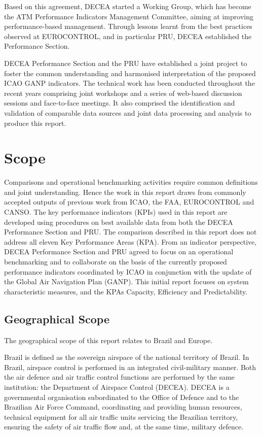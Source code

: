 \documentclass[
]{book}
\begin{document}
Based on this agreement, DECEA started a Working Group, which has become the ATM Performance Indicators Management Committee, aiming at improving performance-based management.
Through lessons learnt from the best practices observed at EUROCONTROL, and in particular PRU, DECEA established the Performance Section.

DECEA Performance Section and the PRU have established a joint project to foster the common understanding and harmonised interpretation of the proposed ICAO GANP indicators. The technical work has been conducted throughout the recent years comprising joint workshops and a series of web-based discussion sessions and face-to-face meetings.
It also comprised the identification and validation of comparable data sources and joint data processing and analysis to produce this report.

\hypertarget{scope}{%
\section{Scope}\label{scope}}

Comparisons and operational benchmarking activities require common definitions and joint understanding.
Hence the work in this report draws from commonly accepted outputs of previous work from ICAO, the FAA, EUROCONTROL and CANSO.
The key performance indicators (KPIs) used in this report are developed using procedures on best available data from both the DECEA Performance Section and PRU. The comparison described in this report does not address all eleven Key Performance Areas (KPA). From an indicator perspective, DECEA Performance Section and PRU agreed to focus on an operational benchmarking and to collaborate on the basis of the currently proposed performance indicators coordinated by ICAO in conjunction with the update of the Global Air Navigation Plan (GANP)\citep{icao_kpi_2016}.
This initial report focuses on system characteristic measures, and the KPAs Capacity, Efficiency and Predictability.

\hypertarget{geographical-scope}{%
\subsection{Geographical Scope}\label{geographical-scope}}

The geographical scope of this report relates to Brazil and Europe.

Brazil is defined as the sovereign airspace of the national territory of Brazil.
In Brazil, airspace control is performed in an integrated civil-military manner.
Both the air defence and air traffic control functions are performed by the same institution: the Department of Airspace Control (DECEA). DECEA is a governmental organisation subordinated to the Office of Defence and to the Brazilian Air Force Command, coordinating and providing human resources, technical equipment for all air traffic units servicing the Brazilian territory, ensuring the safety of air traffic flow and, at the same time, military defence.
\end{document}
